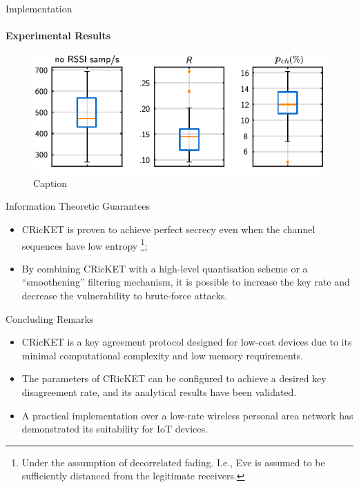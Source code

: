 \begin{frame}{Implementation}
\framesubtitle{Experimental Results}
\begin{figure}
    \centering
    \includegraphics[scale = 1.2]{figures/Cricket/boxplots.pdf}
    \caption{Caption}
    \label{fig:enter-label}
\end{figure}
\end{frame}

\begin{frame}{Information Theoretic Guarantees}

\begin{itemize}
    \item CRicKET is proven to achieve perfect secrecy even when the channel sequences have low entropy \footnote{Under the assumption of decorrelated fading. I.e., Eve is assumed to be sufficiently distanced from the legitimate receivers.};
    \item By combining CRicKET with a high-level quantisation scheme or a ``smoothening'' filtering mechanism, it is possible to increase the key rate and decrease the vulnerability to brute-force attacks.
\end{itemize}
\end{frame}

\begin{frame}{Concluding Remarks}
\begin{itemize}
    \item {CRicKET} is a key agreement protocol designed for low-cost devices due to its minimal computational complexity and low memory requirements.

\item The parameters of {CRicKET} can be configured to achieve a desired key disagreement rate, and its analytical results have been validated.
\item A practical implementation over a low-rate wireless personal area network has demonstrated its suitability for IoT devices.
\end{itemize}
    
\end{frame}